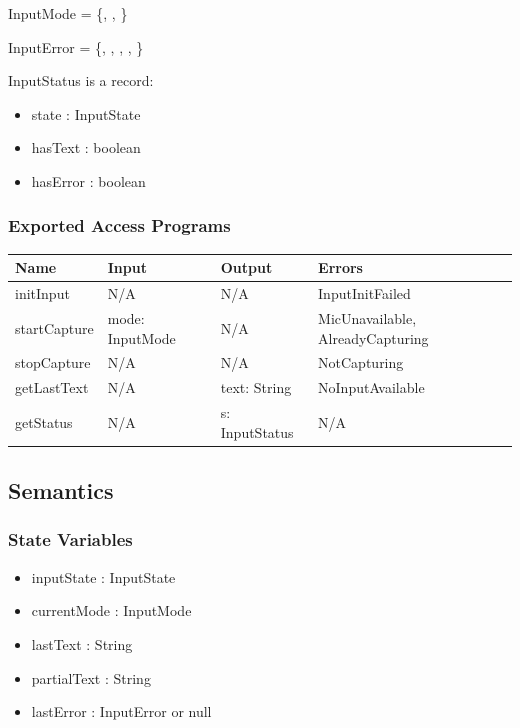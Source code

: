 \documentclass[12pt, titlepage]{article}
\begin{document}
\noindent
InputMode = \{, , \}

\noindent
InputError = \{, ,
, , \}

\noindent
InputStatus is a record:
\begin{itemize}
  \item state : InputState
  \item hasText : boolean
  \item hasError : boolean
\end{itemize}

\subsubsection{Exported Access Programs}

\begin{center}
\begin{tabular}{p{2.7cm} p{4cm} p{4cm} p{2.5cm}}
\hline
\textbf{Name} & \textbf{Input} & \textbf{Output} & \textbf{Errors} \\
\hline
initInput & N/A & N/A & InputInitFailed \\
startCapture & mode: InputMode & N/A &
MicUnavailable, AlreadyCapturing \\
stopCapture & N/A & N/A & NotCapturing \\
getLastText & N/A & text: String & NoInputAvailable \\
getStatus & N/A & s: InputStatus & N/A \\
\hline
\end{tabular}
\end{center}

\subsection{Semantics}

\subsubsection{State Variables}

\begin{itemize}
  \item inputState : InputState
  \item currentMode : InputMode
  \item lastText : String
  \item partialText : String
  \item lastError : InputError or null
\end{itemize}
\end{document}
